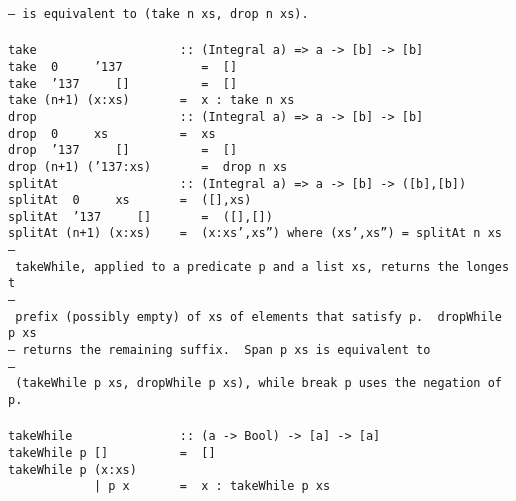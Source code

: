 \mbox{\tt --\ is\ equivalent\ to\ (take\ n\ xs,\ drop\ n\ xs).}\\
\mbox{\tt }\\[-8pt]
\mbox{\tt take\ \ \ \ \ \ \ \ \ \ \ \ \ \ \ \ \ \ \ \ ::\ (Integral\ a)\ =>\ a\ ->\ [b]\ ->\ [b]}\\
\mbox{\tt take\ \ 0\ \ \ \ \ {\char'137}\ \ \ \ \ \ \ \ \ \ \ =\ \ []}\\
\mbox{\tt take\ \ {\char'137}\ \ \ \ \ []\ \ \ \ \ \ \ \ \ \ =\ \ []}\\
\mbox{\tt take\ (n+1)\ (x:xs)\ \ \ \ \ \ \ =\ \ x\ :\ take\ n\ xs}
%
\eprogB\noindent\bprogB
\mbox{\tt drop\ \ \ \ \ \ \ \ \ \ \ \ \ \ \ \ \ \ \ \ ::\ (Integral\ a)\ =>\ a\ ->\ [b]\ ->\ [b]}\\
\mbox{\tt drop\ \ 0\ \ \ \ \ xs\ \ \ \ \ \ \ \ \ \ =\ \ xs}\\
\mbox{\tt drop\ \ {\char'137}\ \ \ \ \ []\ \ \ \ \ \ \ \ \ \ =\ \ []}\\
\mbox{\tt drop\ (n+1)\ ({\char'137}:xs)\ \ \ \ \ \ \ =\ \ drop\ n\ xs}
%
\eprogB\noindent\bprogB
\mbox{\tt splitAt\ \ \ \ \ \ \ \ \ \ \ \ \ \ \ \ \ ::\ (Integral\ a)\ =>\ a\ ->\ [b]\ ->\ ([b],[b])}\\
\mbox{\tt splitAt\ \ 0\ \ \ \ \ xs\ \ \ \ \ \ \ =\ \ ([],xs)}\\
\mbox{\tt splitAt\ \ {\char'137}\ \ \ \ \ []\ \ \ \ \ \ \ =\ \ ([],[])}\\
\mbox{\tt splitAt\ (n+1)\ (x:xs)\ \ \ \ =\ \ (x:xs',xs'')\ where\ (xs',xs'')\ =\ splitAt\ n\ xs}
%
\eprogB\noindent\bprogB
\mbox{\tt --\ takeWhile,\ applied\ to\ a\ predicate\ p\ and\ a\ list\ xs,\ returns\ the\ longest}\\
\mbox{\tt --\ prefix\ (possibly\ empty)\ of\ xs\ of\ elements\ that\ satisfy\ p.\ \ dropWhile\ p\ xs}\\
\mbox{\tt --\ returns\ the\ remaining\ suffix.\ \ Span\ p\ xs\ is\ equivalent\ to}\\
\mbox{\tt --\ (takeWhile\ p\ xs,\ dropWhile\ p\ xs),\ while\ break\ p\ uses\ the\ negation\ of\ p.}\\
\mbox{\tt }\\[-8pt]
\mbox{\tt takeWhile\ \ \ \ \ \ \ \ \ \ \ \ \ \ \ ::\ (a\ ->\ Bool)\ ->\ [a]\ ->\ [a]}\\
\mbox{\tt takeWhile\ p\ []\ \ \ \ \ \ \ \ \ \ =\ \ []}\\
\mbox{\tt takeWhile\ p\ (x:xs)\ }\\
\mbox{\tt \ \ \ \ \ \ \ \ \ \ \ \ |\ p\ x\ \ \ \ \ \ \ =\ \ x\ :\ takeWhile\ p\ xs}\\
